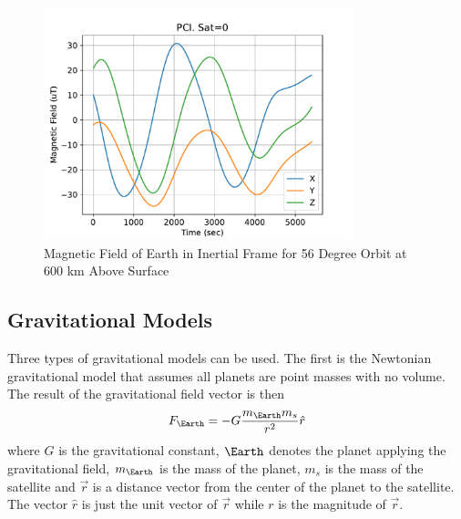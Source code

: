 \documentclass{article}
\begin{document}
\begin{figure}[H]
  \begin{center}
  \includegraphics[width=90mm]{Figures/Magnetic_Field_Orbit}
  \end{center}
  \caption{Magnetic Field of Earth in Inertial Frame for 56 Degree
    Orbit at 600 km Above Surface}\label{f:mag_orbit}
\end{figure}

\subsection{Gravitational Models}

Three types of gravitational models can be used. The first is the
Newtonian gravitational model that assumes all planets are point
masses with no volume. The result of the gravitational field vector is
then
\begin{equation}
  F_{\Earth} = -G\frac{m_{\Earth} m_s}{r^2}\hat{r}
\end{equation}
where $G$ is the gravitational constant, $\Earth$ denotes the planet
applying the gravitational field, $m_\Earth$ is the mass of the
planet, $m_s$ is the mass of the satellite and $\vec{r}$ is a distance
vector from the center of the planet to the satellite. The vector
$\hat{r}$ is just the unit vector of $\vec{r}$ while $r$ is the
magnitude of $\vec{r}$.
\end{document}
